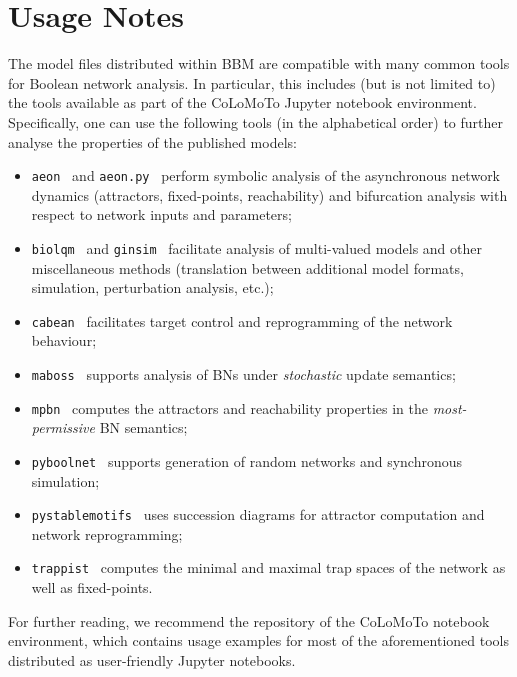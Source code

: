 \documentclass[fleqn,10pt]{wlscirep}
\begin{document}
\section*{Usage Notes}

The model files distributed within BBM are compatible with many common tools for Boolean network analysis. In particular, this includes (but is not limited to) the tools available as part of the CoLoMoTo Jupyter notebook environment.~\cite{colomoto-notebook} Specifically, one can use the following tools (in the alphabetical order) to further analyse the properties of the published models:

\begin{itemize}
	\item \texttt{aeon}~\cite{aeon} and \texttt{aeon.py}~\cite{aeonpy} perform symbolic analysis of the asynchronous network dynamics (attractors, fixed-points, reachability) and bifurcation analysis with respect to network inputs and parameters;
	\item \texttt{biolqm}~\cite{biolqm} and \texttt{ginsim}~\cite{ginsim} facilitate analysis of multi-valued models and other miscellaneous methods (translation between additional model formats, simulation, perturbation analysis, etc.);
	\item \texttt{cabean}~\cite{cabean} facilitates target control and reprogramming of the network behaviour;
	\item \texttt{maboss}~\cite{maboss} supports analysis of BNs under \emph{stochastic} update semantics;
	\item \texttt{mpbn}~\cite{mpbn} computes the attractors and reachability properties in the \emph{most-permissive} BN semantics;
	\item \texttt{pyboolnet}~\cite{pyboolnet} supports generation of random networks and synchronous simulation;
	\item \texttt{pystablemotifs}~\cite{pystablemotifs} uses succession diagrams for attractor computation and network reprogramming;
	\item \texttt{trappist}~\cite{trappist} computes the minimal and maximal trap spaces of the network as well as fixed-points.
\end{itemize}

For further reading, we recommend the repository of the CoLoMoTo notebook environment, which contains usage examples for most of the aforementioned tools distributed as user-friendly Jupyter notebooks.

\end{document}

